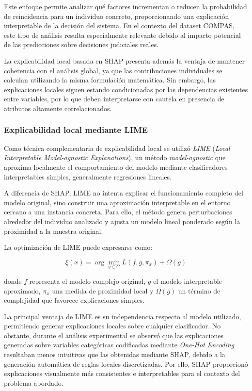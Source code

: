 \documentclass[11pt,a4paper]{article}
\begin{document}
Este enfoque permite analizar qué factores incrementan o reducen la probabilidad de reincidencia para un individuo concreto, proporcionando una explicación interpretable de la decisión del sistema. En el contexto del dataset COMPAS, este tipo de análisis resulta especialmente relevante debido al impacto potencial de las predicciones sobre decisiones judiciales reales.

La explicabilidad local basada en SHAP presenta además la ventaja de mantener coherencia con el análisis global, ya que las contribuciones individuales se calculan utilizando la misma formulación matemática. Sin embargo, las explicaciones locales siguen estando condicionadas por las dependencias existentes entre variables, por lo que deben interpretarse con cautela en presencia de atributos altamente correlacionados.

\subsubsection{Explicabilidad local mediante LIME}

Como técnica complementaria de explicabilidad local se utilizó \textit{LIME} (\textit{Local Interpretable Model-agnostic Explanations}), un método \textit{model-agnostic} que aproxima localmente el comportamiento del modelo mediante clasificadores interpretables simples, generalmente regresiones lineales.

A diferencia de SHAP, LIME no intenta explicar el funcionamiento completo del modelo original, sino construir una aproximación interpretable en el entorno cercano a una instancia concreta. Para ello, el método genera perturbaciones alrededor del individuo analizado y ajusta un modelo lineal ponderado según la proximidad a la muestra original.

La optimización de LIME puede expresarse como:

\[
\xi(x) = \arg\min_{g \in G} L(f, g, \pi_x) + \Omega(g)
\]

donde \(f\) representa el modelo complejo original, \(g\) el modelo interpretable aproximado, \(\pi_x\) una medida de proximidad local y \(\Omega(g)\) un término de complejidad que favorece explicaciones simples.

La principal ventaja de LIME es su independencia respecto al modelo utilizado, permitiendo generar explicaciones locales sobre cualquier clasificador. No obstante, durante el análisis experimental se observó que las explicaciones generadas sobre variables categóricas codificadas mediante \textit{One-Hot Encoding} resultaban menos intuitivas que las obtenidas mediante SHAP, debido a la generación automática de reglas locales discretizadas. Por ello, SHAP proporcionó explicaciones visualmente más consistentes e interpretables para el contexto del problema abordado.
\end{document}
